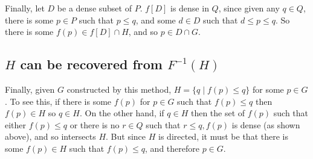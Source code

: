 \documentclass[12pt]{article}
\begin{document}
Finally, let $D$ be a dense subset of $P$.  $f[D]$ is dense in $Q$, since given any $q\in Q$, there is some $p\in P$ such that $p\leq q$, and some $d\in D$ such that $d\leq p\leq q$.  So there is some $f(p)\in f[D]\cap H$, and so $p\in D\cap G$.


\subsection*{$H$ can be recovered from $F^{-1}(H)$}
Finally, given $G$ constructed by this method, $H=\{q\mid f(p)\leq q\}$ for some $p\in G$.  To see this, if there is some $f(p)$ for $p\in G$ such that $f(p)\leq q$ then $f(p)\in H$ so $q\in H$.  On the other hand, if $q\in H$ then the set of $f(p)$ such that either $f(p)\leq q$ or there is no $r\in Q$ such that $r\leq q,f(p)$ is dense (as shown above), and so intersects $H$.  But since $H$ is directed, it must be that there is some $f(p)\in H$ such that $f(p)\leq q$, and therefore $p\in G$.
\end{document}
